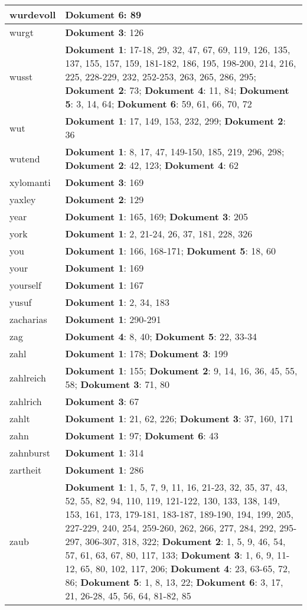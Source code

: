 \documentclass[a5paper]{article}
\begin{document}
\begin{longtable}[l]{|l|p{3in}|}
\hline
wurdevoll & \textbf{Dokument 6}: 89 \\
\hline
wurgt & \textbf{Dokument 3}: 126 \\
\hline
wusst & \textbf{Dokument 1}: 17-18, 29, 32, 47, 67, 69, 119, 126, 135, 137, 155, 157, 159, 181-182, 186, 195, 198-200, 214, 216, 225, 228-229, 232, 252-253, 263, 265, 286, 295; \textbf{Dokument 2}: 73; \textbf{Dokument 4}: 11, 84; \textbf{Dokument 5}: 3, 14, 64; \textbf{Dokument 6}: 59, 61, 66, 70, 72 \\
\hline
wut & \textbf{Dokument 1}: 17, 149, 153, 232, 299; \textbf{Dokument 2}: 36 \\
\hline
wutend & \textbf{Dokument 1}: 8, 17, 47, 149-150, 185, 219, 296, 298; \textbf{Dokument 2}: 42, 123; \textbf{Dokument 4}: 62 \\
\hline
xylomanti & \textbf{Dokument 3}: 169 \\
\hline
yaxley & \textbf{Dokument 2}: 129 \\
\hline
year & \textbf{Dokument 1}: 165, 169; \textbf{Dokument 3}: 205 \\
\hline
york & \textbf{Dokument 1}: 2, 21-24, 26, 37, 181, 228, 326 \\
\hline
you & \textbf{Dokument 1}: 166, 168-171; \textbf{Dokument 5}: 18, 60 \\
\hline
your & \textbf{Dokument 1}: 169 \\
\hline
yourself & \textbf{Dokument 1}: 167 \\
\hline
yusuf & \textbf{Dokument 1}: 2, 34, 183 \\
\hline
zacharias & \textbf{Dokument 1}: 290-291 \\
\hline
zag & \textbf{Dokument 4}: 8, 40; \textbf{Dokument 5}: 22, 33-34 \\
\hline
zahl & \textbf{Dokument 1}: 178; \textbf{Dokument 3}: 199 \\
\hline
zahlreich & \textbf{Dokument 1}: 155; \textbf{Dokument 2}: 9, 14, 16, 36, 45, 55, 58; \textbf{Dokument 3}: 71, 80 \\
\hline
zahlrich & \textbf{Dokument 3}: 67 \\
\hline
zahlt & \textbf{Dokument 1}: 21, 62, 226; \textbf{Dokument 3}: 37, 160, 171 \\
\hline
zahn & \textbf{Dokument 1}: 97; \textbf{Dokument 6}: 43 \\
\hline
zahnburst & \textbf{Dokument 1}: 314 \\
\hline
zartheit & \textbf{Dokument 1}: 286 \\
\hline
zaub & \textbf{Dokument 1}: 1, 5, 7, 9, 11, 16, 21-23, 32, 35, 37, 43, 52, 55, 82, 94, 110, 119, 121-122, 130, 133, 138, 149, 153, 161, 173, 179-181, 183-187, 189-190, 194, 199, 205, 227-229, 240, 254, 259-260, 262, 266, 277, 284, 292, 295-297, 306-307, 318, 322; \textbf{Dokument 2}: 1, 5, 9, 46, 54, 57, 61, 63, 67, 80, 117, 133; \textbf{Dokument 3}: 1, 6, 9, 11-12, 65, 80, 102, 117, 206; \textbf{Dokument 4}: 23, 63-65, 72, 86; \textbf{Dokument 5}: 1, 8, 13, 22; \textbf{Dokument 6}: 3, 17, 21, 26-28, 45, 56, 64, 81-82, 85 \\

\end{longtable}
\end{document}
